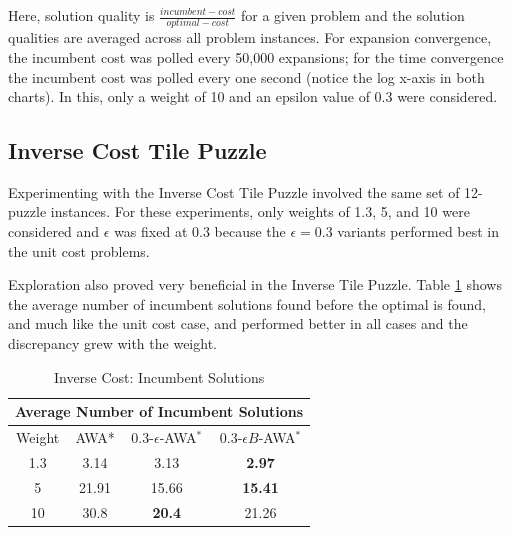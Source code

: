 
Here, solution quality is $\frac{incumbent-cost}{optimal-cost}$ for a given problem and the solution qualities are averaged across all problem instances. For expansion convergence, the incumbent cost was polled every 50,000 expansions; for the time convergence the incumbent cost was polled every one second (notice the log x-axis in both charts). In this, only a weight of 10 and an epsilon value of 0.3 were considered. 

\subsection{Inverse Cost Tile Puzzle}
Experimenting with the Inverse Cost Tile Puzzle involved the same set of 12-puzzle instances. For these experiments, only weights of 1.3, 5, and 10 were considered and $\epsilon$ was fixed at 0.3 because the  $\epsilon=0.3$ variants performed best in the unit cost problems. 

Exploration also proved very beneficial in the Inverse Tile Puzzle. Table \ref{tab:inv-sol} shows the average number of incumbent solutions found before the optimal is found, and much like the unit cost case, \eawa and \ebawa performed better in all cases and the discrepancy grew with the weight. 

\begin{table}
\def\arraystretch{1.3}
\begin{tabular}{ |c||c|c|c|  }
    \hline
    \multicolumn{4}{|c|}{Average Number of Incumbent Solutions} \\
    \hline
    Weight& AWA* & $0.3$-$\epsilon$-AWA$^*$ & $0.3$-$\epsilon B$-AWA$^*$\\
    \hline
    1.3 & 3.14 & 3.13 & \textbf{2.97} \\
    \hline
    5 & 21.91 & 15.66 & \textbf{15.41} \\
    \hline
    10& 30.8 & \textbf{20.4} & 21.26 \\
    \hline
\end{tabular}
\caption{Inverse Cost: Incumbent Solutions}\label{tab:inv-sol}
\end{table}

